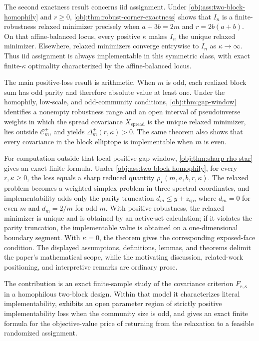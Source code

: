 \documentclass[11pt]{article}
\begin{document}
The second exactness result concerns iid assignment. Under \cref{obj:ass:two-block-homophily} and \(r\ge0\), \cref{obj:thm:robust-corner-exactness} shows that \(I_n\) is a finite-robustness relaxed minimizer precisely when \(a+3b=2m\) and \(r=2b(a+b)\). On that affine-balanced locus, every positive \(\kappa\) makes \(I_n\) the unique relaxed minimizer. Elsewhere, relaxed minimizers converge entrywise to \(I_n\) as \(\kappa\to\infty\). Thus iid assignment is always implementable in this symmetric class, with exact finite-\(\kappa\) optimality characterized by the affine-balanced locus.

The main positive-loss result is arithmetic. When \(m\) is odd, each realized block sum has odd parity and therefore absolute value at least one. Under the homophily, low-scale, and odd-community conditions, \cref{obj:thm:gap-window} identifies a nonempty robustness range and an open interval of pseudoinverse weights in which the spread covariance \(X_{\mathrm{spread}}\) is the unique relaxed minimizer, lies outside \(\mathcal C_m^{\pm}\), and yields \(\Delta_m^{\pm}(r,\kappa)>0\). The same theorem also shows that every covariance in the block elliptope is implementable when \(m\) is even.

For computation outside that local positive-gap window, \cref{obj:thm:sharp-rho-star} gives an exact finite formula. Under \cref{obj:ass:two-block-homophily}, for every \(r,\kappa\ge0\), the loss equals a sharp reduced quantity \(\rho_\star(m,a,b,r,\kappa)\). The relaxed problem becomes a weighted simplex problem in three spectral coordinates, and implementability adds only the parity truncation \(d_m\le y+z_{\mathrm{sp}}\), where \(d_m=0\) for even \(m\) and \(d_m=2/m\) for odd \(m\). With positive robustness, the relaxed minimizer is unique and is obtained by an active-set calculation; if it violates the parity truncation, the implementable value is obtained on a one-dimensional boundary segment. With \(\kappa=0\), the theorem gives the corresponding exposed-face condition. The displayed assumptions, definitions, lemmas, and theorems delimit the paper's mathematical scope, while the motivating discussion, related-work positioning, and interpretive remarks are ordinary prose.

The contribution is an exact finite-sample study of the covariance criterion \(F_{r,\kappa}\) in a homophilous two-block design. Within that model it characterizes literal implementability, exhibits an open parameter region of strictly positive implementability loss when the community size is odd, and gives an exact finite formula for the objective-value price of returning from the relaxation to a feasible randomized assignment.
\end{document}
